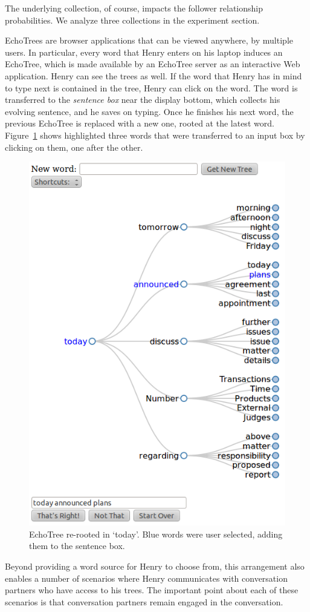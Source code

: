 \documentclass{sigchi}
\begin{document}
The underlying collection, of course, impacts the follower
relationship probabilities. We analyze three collections in the
experiment section.

EchoTrees are browser applications that can be viewed anywhere, by
multiple users. In particular, every word that Henry enters on his
laptop induces an EchoTree, which is made available by an EchoTree
server as an interactive Web application. Henry can see the trees as
well. If the word that Henry has in mind to type next is contained in
the tree, Henry can click on the word. The word is transferred to the
{\em sentence box} near the display bottom, which collects his
evolving sentence, and he saves on typing. Once he finishes his next
word, the previous EchoTree is replaced with a new one, rooted at the
latest word. Figure~\ref{fig:todayTree} shows highlighted three words
that were transferred to an input box by clicking on them, one after
the other.
\begin{figure}
   \centering
   \includegraphics[width=0.6\columnwidth]{Figs/echoTreeRootToday.png}
   \caption{EchoTree re-rooted in `today'. Blue words were user
     selected, adding them to the sentence box.}
   \label{fig:todayTree}
\end{figure}
Beyond providing a word source for Henry to choose from, this
arrangement also enables a number of scenarios where Henry
communicates with conversation partners who have access to his
trees. The important point about each of these scenarios is that
conversation partners remain engaged in the conversation.
\end{document}
